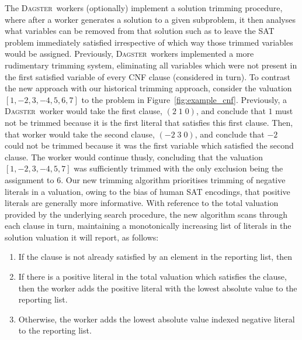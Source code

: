 \documentclass[10pt,a4paper,oneside,headinclude,footinclude,BCOR5mm]{scrartcl}
\newcommand{\dagster}{\textsc{Dagster}\xspace}
\begin{document}
The \dagster\ workers (optionally) implement a solution trimming procedure, where after a worker generates a solution to a given subproblem, it then analyses what variables can be removed from that solution such as to leave the SAT problem immediately satisfied irrespective of which way those trimmed variables would be assigned.
%
Previously, \dagster\ workers implemented a more rudimentary trimming system, eliminating all variables which were not present in the first satisfied variable of every CNF clause (considered in turn).
To contrast the new approach with our historical trimming approach, consider the valuation $[1,-2,3,-4,5,6,7]$ to the problem in Figure~\ref{fig:example_cnf}.
Previously, a \dagster\ worker would take the first clause, $(2\; 1\; 0)$, and conclude that $1$ must not be trimmed because it is the first literal that satisfies this first clause.
Then, that worker would take the second clause, $(-2\; 3\; 0)$, and conclude that $-2$ could not be trimmed because it was the first variable which satisfied the second clause.
The worker would continue thusly, concluding that the valuation $[1,-2,3,-4,5,7]$ was sufficiently trimmed with the only exclusion being the assignment to $6$.
Our new trimming algorithm prioritises trimming of negative literals in a valuation, owing to the bias of human SAT encodings, that positive literals are generally more informative.
With reference to the total valuation provided by the underlying search procedure, the new algorithm scans through each clause in turn, maintaining a monotonically increasing list of literals in the solution valuation it will report, as follows:%
\begin{enumerate}
\item	If the clause is not already satisfied by an element in the reporting list, then
\item	If there is a positive literal in the total valuation which satisfies the clause, then the worker adds the positive literal with the lowest absolute value to the reporting list.
\item	Otherwise, the worker adds the lowest absolute value indexed negative literal to the reporting list.
\end{enumerate}
\end{document}
